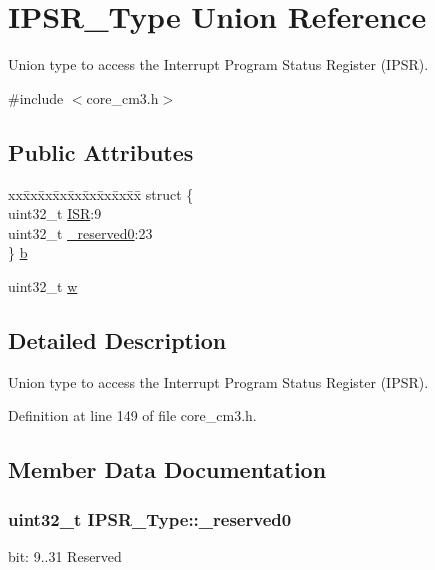 \hypertarget{union_i_p_s_r___type}{\section{\-I\-P\-S\-R\-\_\-\-Type \-Union \-Reference}
\label{union_i_p_s_r___type}
}


\-Union type to access the \-Interrupt \-Program \-Status \-Register (\-I\-P\-S\-R).  




{\ttfamily \#include $<$core\-\_\-cm3.\-h$>$}

\subsection*{\-Public \-Attributes}
\begin{DoxyCompactItemize}
\item 
\begin{tabbing}
xx\=xx\=xx\=xx\=xx\=xx\=xx\=xx\=xx\=\kill
struct \{\\
\>uint32\_t \hyperlink{union_i_p_s_r___type_ab46e5f1b2f4d17cfb9aca4fffcbb2fa5}{ISR}:9\\
\>uint32\_t \hyperlink{union_i_p_s_r___type_ad2eb0a06de4f03f58874a727716aa9aa}{\_reserved0}:23\\
\} \hyperlink{union_i_p_s_r___type_add0d6497bd50c25569ea22b48a03ec50}{b}\\

\end{tabbing}\item 
uint32\-\_\-t \hyperlink{union_i_p_s_r___type_a4adca999d3a0bc1ae682d73ea7cfa879}{w}
\end{DoxyCompactItemize}


\subsection{\-Detailed \-Description}
\-Union type to access the \-Interrupt \-Program \-Status \-Register (\-I\-P\-S\-R). 

\-Definition at line 149 of file core\-\_\-cm3.\-h.



\subsection{\-Member \-Data \-Documentation}
\hypertarget{union_i_p_s_r___type_ad2eb0a06de4f03f58874a727716aa9aa}{
\subsubsection[{\-\_\-reserved0}]{\setlength{\rightskip}{0pt plus 5cm}uint32\-\_\-t {\bf \-I\-P\-S\-R\-\_\-\-Type\-::\-\_\-reserved0}}}\label{union_i_p_s_r___type_ad2eb0a06de4f03f58874a727716aa9aa}
bit\-: 9..31 \-Reserved 

